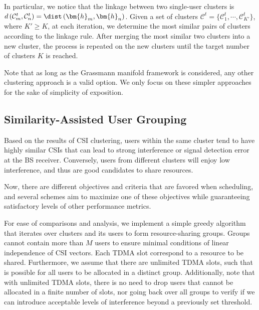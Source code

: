 In particular, we notice that the linkage between two single-user clusters is $d \left( {{\mathcal{C}_m^t},{\mathcal{C}_n^t}} \right) ={\dist \left( {{{\bm{h}}_{m}},{{\bm{h}}_{n}} } \right)}$. Given a set of clusters $\mathcal{C}^t=\{\mathcal{C}_1^t,\cdots, \mathcal{C}_{K'}^t\}$, where $K'\geq K$, at each iteration, we determine the most similar pairs of clusters according to the linkage rule. 
After merging the most similar two clusters 
into a new cluster, the process is repeated on the new clusters
until the target number of clusters $K$ is reached.

Note that as long as the Grassmann manifold framework is considered, any other clustering approach is a valid option. We only focus on these simpler approaches for the sake of simplicity of exposition. 




\subsection{Similarity-Assisted User Grouping} \label{ssec:USCH_grouping}



Based on the results of CSI clustering, users within the same cluster tend to have highly similar CSIs that can lead to strong interference
or signal detection error at the BS receiver. Conversely, users from different clusters will enjoy low interference, and thus are good candidates to share resources.

Now, there are different objectives and criteria that are favored when scheduling, and several schemes aim to maximize one of these objectives while guaranteeing satisfactory levels of other performance metrics. 

For ease of comparisons and analysis, we implement a simple greedy algorithm that iterates over clusters and its users to form resource-sharing groups. Groups cannot contain more than $M$ users to ensure minimal conditions of linear independence of CSI vectors. Each TDMA slot correspond to a resource to be shared. Furthermore, we assume that there are unlimited TDMA slots, such that is possible for all users to be allocated in a distinct group. Additionally, note that with unlimited TDMA slots, there is no need to drop users that cannot be allocated in a finite number of slots, nor going back over all groups to verify if we can introduce acceptable levels of interference beyond a previously set threshold. 

